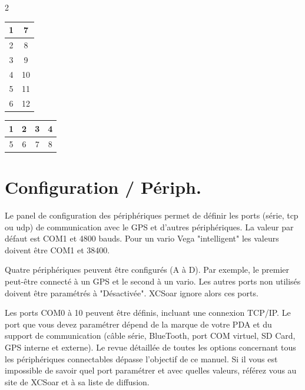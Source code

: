 \begin{multicols}{2}
\begin{tabular}{|c|c|}
\hline
1 & 7 \\
\hline
2 & 8 \\
\hline
3 & 9 \\
\hline
4 & 10 \\
\hline
5 & 11 \\
\hline
6 & 12 \\
\hline
\end{tabular}

\begin{tabular}{|c|c|c|c|}
\hline
1 & 2 & 3 & 4 \\
\hline
\hline
5 & 6 & 7 & 8 \\
\hline
\end{tabular}
\end{multicols}

\section{Configuration / Périph.} \label{conf:comdevices}

Le panel de configuration des périphériques permet de définir les ports (série, tcp ou udp) de communication avec le GPS et d'autres périphériques. La valeur par défaut est COM1 et 4800 bauds. Pour un vario Vega "intelligent" les valeurs doivent être COM1 et 38400.

Quatre périphériques peuvent être configurés (A à D). Par exemple, le premier peut-être connecté à un GPS et le second à un vario. Les autres ports non utilisés doivent être paramétrés à "Désactivée". XCSoar ignore alors ces ports.

Les ports COM0 à 10 peuvent être définis, incluant une connexion TCP/IP. Le port que vous devez paramétrer dépend de la marque de votre PDA et du support de communication (câble série, BlueTooth, port COM virtuel, SD Card, GPS interne et externe). Le revue détaillée de toutes les options concernant tous les périphériques connectables dépasse l'objectif de ce manuel. Si il vous est impossible de savoir quel port paramétrer et avec quelles valeurs, référez vous au site de XCSoar et à sa liste de diffusion.

